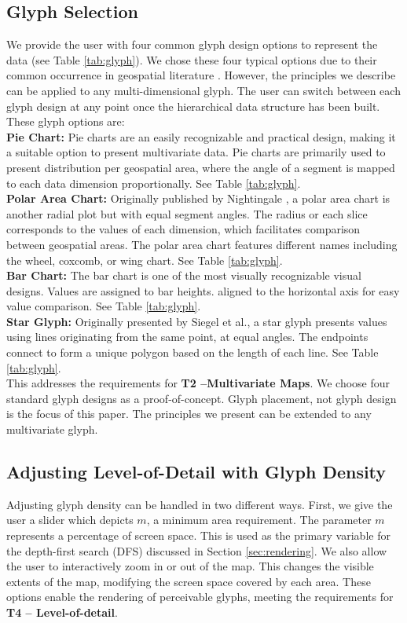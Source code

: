\subsection{Glyph Selection} \label{sec:glyphSelect}
We provide the user with four common glyph design options to represent the data (see Table \ref{tab:glyph}). We chose these four typical options due to their common occurrence in geospatial literature \cite{andrienko2006exploratory}. However, the principles we describe can be applied to any multi-dimensional glyph. The user can switch between each glyph design at any point once the hierarchical data structure has been built. These glyph options are:\\
\textbf{Pie Chart:} Pie charts are an easily recognizable and practical design, making it a suitable option to present multivariate data. Pie charts are primarily used to present distribution per geospatial area, where the angle of a segment is mapped to each data dimension proportionally. See Table \ref{tab:glyph}.\\
\textbf{Polar Area Chart:} Originally published by Nightingale \cite{nightingale1858notes}, a polar area chart is another radial plot but with equal segment angles. The radius or each slice corresponds to the values of each dimension, which facilitates comparison between geospatial areas. The polar area chart features different names including the wheel, coxcomb, or wing chart. See Table \ref{tab:glyph}. \\
\textbf{Bar Chart:} The bar chart is one of the most visually recognizable visual designs. Values are assigned to bar heights. aligned to the horizontal axis for easy value comparison. See Table \ref{tab:glyph}.\\
\textbf{Star Glyph:} Originally presented by Siegel et al.\cite{siegel1972surgical}, a star glyph presents values using lines originating from the same point, at equal angles. The endpoints connect to form a unique polygon based on the length of each line. See Table \ref{tab:glyph}.\\ This addresses the requirements for \textbf{T2 --Multivariate Maps}. We choose four standard glyph designs as a proof-of-concept. Glyph placement, not glyph design is the focus of this paper. The principles we present can be extended to any multivariate glyph.

\subsection{Adjusting Level-of-Detail with Glyph Density} \label{sec:scaleAdjust}
Adjusting glyph density can be handled in two different ways. First, we give the user a slider which depicts $m$, a minimum area requirement. The parameter $m$ represents a percentage of screen space. This is used as the primary variable for the depth-first search (DFS) discussed in Section \ref{sec:rendering}. We also allow the user to interactively zoom in or out of the map. This changes the visible extents of the map, modifying the screen space covered by each area. These options enable the rendering of perceivable glyphs, meeting the requirements for \textbf{T4 -- Level-of-detail}.

